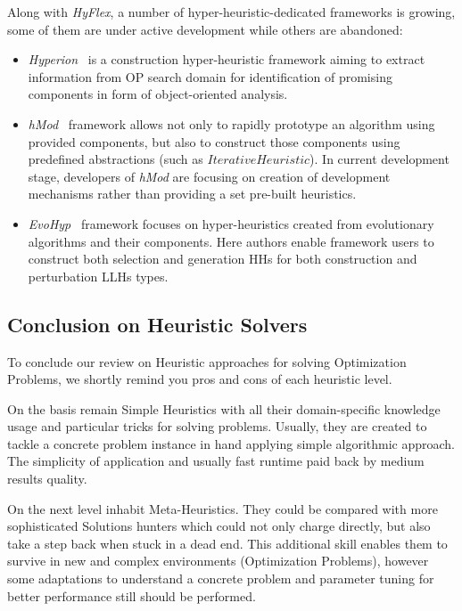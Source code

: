 Along with \textit{HyFlex}, a number of hyper-heuristic-dedicated frameworks is growing, some of them are under active development while others are abandoned:
\begin{itemize}[itemsep=8pt]
	\item \textit{Hyperion}~\cite{swan2011hyperion} is a construction hyper-heuristic framework aiming to extract information from OP search domain for identification of promising components in form of object-oriented analysis.
	
	\item \textit{hMod}~\cite{urra2013hMod} framework allows not only to rapidly prototype an algorithm using provided components, but also to construct those components using predefined abstractions (such as $IterativeHeuristic$). In current development stage, developers of \textit{hMod} are focusing on creation of development mechanisms rather than providing a set pre-built heuristics. 
	
	\item \textit{EvoHyp}~\cite{pillay2017evohyp} framework focuses on hyper-heuristics created from evolutionary algorithms and their components. Here authors enable framework users to construct both selection and generation HHs for both construction and perturbation LLHs types.
\end{itemize}


\subsection{Conclusion on Heuristic Solvers}
To conclude our review on Heuristic approaches for solving Optimization Problems, we shortly remind you pros and cons of each heuristic level.

On the basis remain Simple Heuristics with all their domain-specific knowledge usage and particular tricks for solving problems. Usually, they are created to tackle a concrete problem instance in hand applying simple algorithmic approach. The simplicity of application and usually fast runtime paid back by medium results quality.

On the next level inhabit Meta-Heuristics. They could be compared with more sophisticated Solutions hunters which could not only charge directly, but also take a step back when stuck in a dead end. This additional skill enables them to survive in new and complex environments (Optimization Problems), however some adaptations to understand a concrete problem and parameter tuning for better performance still should be performed.

